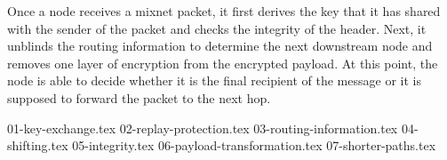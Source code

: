 Once a node receives a mixnet packet, it first derives the key that it has shared with the sender of the packet and checks the integrity of the header. Next, it unblinds the routing information to determine the next downstream node and removes one layer of encryption from the encrypted payload. At this point, the node is able to decide whether it is the final recipient of the message or it is supposed to forward the packet to the next hop.

\begin{comment}
\paragraph{Notation:}Let $\kappa=128$ be the security parameter. With non-negligible probability, an adversary must perform around $2^\kappa$ operations to break the security of Sphinx.

Let $r$ be the maximum number of nodes that a Sphinx mix message will traverse before being delivered to its destination.

$G$ is a prime order cyclic group satisfying the decisional Diffie-Hellman assumption \cite{Boneh_1998}. We use the secp256k1 elliptic curve \cite{secp}. The element $g$ is a generator of $G$ and $q$ is the (prime) order of $G$, with $q\approx2^{2*\kappa}$.

$G^*$ is the set of non-identity elements of G. $h_b$ is a pre-image resistant hash function used to compute blinding factors and modelled as a random oracle such that
$h_b:G^*\times G^*\rightarrow\mathbb{Z}^*_q$, where $\mathbb{Z}^*_q$ is the field of non-identity elements of $\mathbb{Z}_q$ (field of integers). We use the BLAKE2s hash function \cite{blake2}.

Each node $i$ has a private key $x_{i}\in \mathbb{Z}^*_q$ and a public key $y_{i}=g^{x_{i}}\in G^*$.
$\alpha_i$ is the group elements which, when combined with the nodes’ public keys, allow a shared key to be computed for each via Diffie-Hellman (DH) key exchange. This ensures that each node in the user-chosen route can forward the packet to the next, and only the receiving mix node can decrypt it.
$s_i$ are the DH shared secrets, $b_i$ are the blinding factors.
\end{comment}

{01-key-exchange.tex}
{02-replay-protection.tex}
{03-routing-information.tex}
{04-shifting.tex}
{05-integrity.tex}
{06-payload-transformation.tex}
{07-shorter-paths.tex}